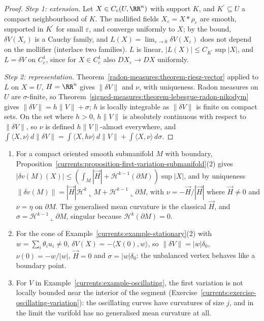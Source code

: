 \begin{proof}
\emph{Step 1: extension.} Let $X \in C_c(U, \RR^n)$ with support $K$, and $K^{\prime} \subseteq U$ a compact neighbourhood of $K$. The mollified fields $X_\varepsilon = X * \rho_\varepsilon$ are smooth, supported in
$K^{\prime}$ for small $\varepsilon$, and converge uniformly to $X$; by the bound, $\delta V(X_\varepsilon)$ is a Cauchy family, and $L(X) = \lim_{\varepsilon \to 0}\delta V(X_\varepsilon)$ does not depend on
the mollifier (interlace two families). $L$ is linear, $|L(X)| \leq C_{K^{\prime}}\sup|X|$, and $L = \delta V$ on $C^1_c$, since for $X \in C^1_c$ also $DX_\varepsilon \to DX$ uniformly.

\emph{Step 2: representation.} Theorem~\ref{radon-measures:theorem-riesz-vector} applied to $L$ on $X = U$, $H = \RR^n$ gives $\|\delta V\|$ and $\nu$, with uniqueness. Radon measures on $U$ are
$\sigma$-finite, so Theorem~\ref{signed-measures:theorem-lebesgue-radon-nikodym} gives $\|\delta V\| = h\|V\| + \sigma$; $h$ is locally integrable as $\|\delta V\|$ is finite on compact sets. On the set where
$h > 0$, $h\|V\|$ is absolutely continuous with respect to $\|\delta V\|$, so $\nu$ is defined $h\|V\|$-almost everywhere, and $\int\langle X, \nu\rangle\,d\|\delta V\| = \int\langle X, h\nu\rangle\,d\|V\| + \int\langle X, \nu\rangle\,d\sigma$.
\end{proof}

\begin{example}\label{currents:example-generalised-mean-curvature}
\begin{enumerate}
\item For a compact oriented smooth submanifold $M$ with boundary, Proposition~\ref{currents:proposition-first-variation-submanifold}(2) gives
$|\delta v(M)(X)| \leq (\int_M|\vec{H}| + \mathcal{H}^{k-1}(\partial M))\sup|X|$, and by uniqueness $\|\delta v(M)\| = |\vec{H}|\mathcal{H}^k\llcorner M + \mathcal{H}^{k-1}\llcorner\partial M$, with
$\nu = -\vec{H}/|\vec{H}|$ where $\vec{H} \neq 0$ and $\nu = \eta$ on $\partial M$. The generalised mean curvature is the classical $\vec{H}$, and $\sigma = \mathcal{H}^{k-1}\llcorner\partial M$, singular because
$\mathcal{H}^k(\partial M) = 0$.
\item For the cone of Example~\ref{currents:example-stationary}(2) with $w = \sum_i\theta_iu_i \neq 0$, $\delta V(X) = -\langle X(0), w\rangle$, so $\|\delta V\| = |w|\delta_0$, $\nu(0) = -w/|w|$,
$\vec{H} = 0$ and $\sigma = |w|\delta_0$: the unbalanced vertex behaves like a boundary point.
\item For $V$ in Example~\ref{currents:example-oscillating}, the first variation is not locally bounded near the interior of the segment (Exercise~\ref{currents:exercise-oscillating-variation}): the
oscillating curves have curvatures of size $j$, and in the limit the varifold has no generalised mean curvature at all.
\end{enumerate}
\end{example}

